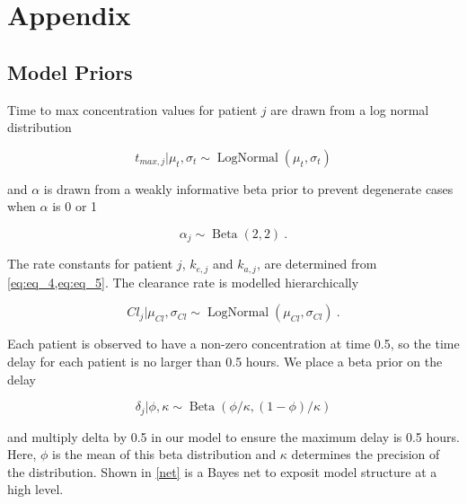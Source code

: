 \section{Appendix}
\subsection{Model Priors}
Time to max concentration values for patient $j$ are drawn from a log normal distribution

\begin{equation}\label{eq:eq_6}
t_{\mathit{max}, j} \vert \mu_t, \sigma_t \sim \operatorname{LogNormal}(\mu_t, \sigma_t)
\end{equation}

\noindent and $\alpha$ is drawn from a weakly informative beta prior to prevent degenerate cases when $\alpha$  is 0 or 1

\begin{equation}\label{eq:eq_7}
\alpha_j \sim \operatorname{Beta}(2,2)  \>.
\end{equation}

\noindent The rate constants for patient $j$,  $k_{e,j}$ and $k_{a,j}$, are determined from \cref{eq:eq_4,eq:eq_5}. The clearance rate is modelled hierarchically

\begin{equation}\label{eq:eq_8}
\mathit{Cl}_j \vert \mu_{\mathit{Cl}}, \sigma_{\mathit{Cl}}  \sim \operatorname{LogNormal}(\mu_{\mathit{Cl}}, \sigma_{\mathit{Cl}}) \>.
\end{equation}

\noindent Each patient is observed to have a non-zero concentration at time 0.5, so the time delay for each patient is no larger than 0.5 hours.  We place a beta prior on the delay

\begin{equation}\label{eq:eq_9}
\delta_j \vert \phi, \kappa \sim \operatorname{Beta}(\phi / \kappa, (1-\phi) / \kappa)
\end{equation}

\noindent and multiply delta by 0.5 in our model to ensure the maximum delay is 0.5 hours.  Here, $\phi$ is the mean of this beta distribution and $\kappa$ determines the precision of the distribution. Shown in \cref{net} is a Bayes net to exposit model structure at a high level.

